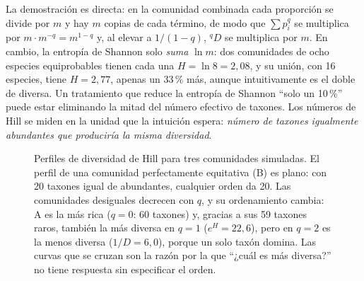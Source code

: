 La demostración es directa: en la comunidad combinada cada proporción se divide por $m$ y hay $m$ copias de cada término, de modo que $\sum p_i^q$ se multiplica por $m\cdot m^{-q} = m^{1-q}$ y, al elevar a $1/(1-q)$, ${}^qD$ se multiplica por $m$. En cambio, la entropía de Shannon solo \emph{suma} $\ln m$: dos comunidades de ocho especies equiprobables tienen cada una $H=\ln 8 = 2{,}08$, y su unión, con 16 especies, tiene $H=2{,}77$, apenas un 33\,\% más, aunque intuitivamente es el doble de diversa. Un tratamiento que reduce la entropía de Shannon ``solo un 10\,\%'' puede estar eliminando la mitad del número efectivo de taxones. Los números de Hill se miden en la unidad que la intuición espera: \emph{número de taxones igualmente abundantes que produciría la misma diversidad}.

\begin{figure}[t]
\centering
{}
\caption[Perfiles de diversidad de Hill]{Perfiles de diversidad de Hill para tres comunidades simuladas. El perfil de una comunidad perfectamente equitativa (B) es plano: con 20 taxones igual de abundantes, cualquier orden da 20. Las comunidades desiguales decrecen con $q$, y su ordenamiento cambia: A es la más rica ($q=0$: 60 taxones) y, gracias a sus 59 taxones raros, también la más diversa en $q=1$ ($e^H=22{,}6$), pero en $q=2$ es la menos diversa ($1/D=6{,}0$), porque un solo taxón domina. Las curvas que se cruzan son la razón por la que ``¿cuál es más diversa?'' no tiene respuesta sin especificar el orden.}
\label{fig:14-hill}
\end{figure}

